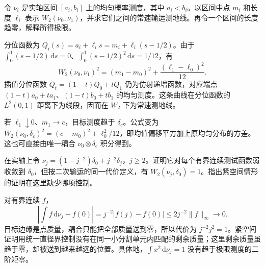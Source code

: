 \begin{exercise}\label{g3:ex:C-uniform-intervals}
	令 \(\nu_i\) 是实轴区间 \([a_i,b_i]\) 上的均匀概率测度，其中 \(a_i<b_i\)。以区间中点 \(m_i\) 和长度 \(\ell_i\) 表示 \(W_2(\nu_0,\nu_1)\)，并求它们之间的常速输运测地线。再令一个区间的长度趋零，解释所得极限。
\end{exercise}
\begin{solution}
	分位函数为 \(Q_i(s)=a_i+\ell_i s=m_i+\ell_i(s-1/2)\)。由于 \(\int_0^1(s-1/2)\,\mathrm ds=0\)、\(\int_0^1(s-1/2)^2\,\mathrm ds=1/12\)，有
	\[
		W_2(\nu_0,\nu_1)^2
		=(m_1-m_0)^2+\frac{(\ell_1-\ell_0)^2}{12}.
	\]
	插值分位函数 \(Q_t=(1-t)Q_0+tQ_1\) 仍为仿射递增函数，对应端点 \((1-t)a_0+ta_1\)、\((1-t)b_0+tb_1\) 的均匀测度。这条曲线在分位函数的 \(L^2(0,1)\) 距离下为线段，因而在 \(W_2\) 下为常速测地线。

	若 \(\ell_1\downarrow0\)、\(m_1\to c\)，目标测度趋于 \(\delta_c\)。公式变为
	\(W_2(\nu_0,\delta_c)^2=(c-m_0)^2+\ell_0^2/12\)，即均值偏移平方加上原均匀分布的方差。这也可直接由唯一耦合 \(\nu_0\otimes\delta_c\) 积分得到。
\end{solution}

\begin{exercise}\label{g3:ex:C-weak-moment-escape}
	在实轴上令 \(\nu_j=(1-j^{-2})\delta_0+j^{-2}\delta_j\)，\(j\ge2\)。证明它对每个有界连续测试函数弱收敛到 \(\delta_0\)，但按二次输运的同一代价定义，有 \(W_2(\nu_j,\delta_0)=1\)。指出紧空间情形的证明在这里缺少哪项控制。
\end{exercise}
\begin{solution}
	对有界连续 \(f\)，
	\[
		\left|\int f\,\mathrm d\nu_j-f(0)\right|
		=j^{-2}|f(j)-f(0)|\le2j^{-2}\|f\|_\infty\longrightarrow0.
	\]
	目标边缘是点质量，耦合只能把全部质量送到零，所以代价为 \(j^{-2}j^2=1\)。紧空间证明用统一直径界控制没有在同一小分割单元内匹配的剩余质量；这里剩余质量虽趋于零，却被送到越来越远的位置。具体地，\(\int x^2\,\mathrm d\nu_j=1\) 没有趋于极限测度的二阶矩零。
\end{solution}

